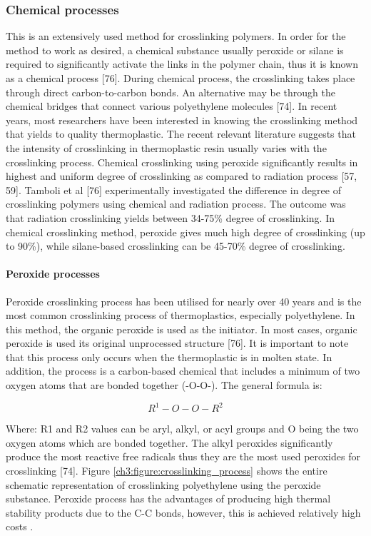 \documentclass[12pt]{report}
\begin{document}
\subsubsection{Chemical processes}
This is an extensively used method for crosslinking polymers. In order for the method to work as desired, a chemical substance usually peroxide or silane is required to significantly activate the links in the polymer chain, thus it is known as a chemical process [76]. During chemical process, the crosslinking takes place through direct carbon-to-carbon bonds. An alternative may be through the chemical bridges that connect various polyethylene molecules [74].  
In recent years, most researchers have been interested in knowing the crosslinking method that yields to quality thermoplastic. The recent relevant literature suggests that the intensity of crosslinking in thermoplastic resin usually varies with the crosslinking process. Chemical crosslinking using peroxide significantly results in highest and uniform degree of crosslinking as compared to radiation process [57, 59]. Tamboli et al [76] experimentally investigated the difference in degree of crosslinking polymers using chemical and radiation process. The outcome was that radiation crosslinking yields between 34-75\% degree of crosslinking. In chemical crosslinking method, peroxide gives much high degree of crosslinking (up to 90\%), while silane-based crosslinking can be 45-70\% degree of crosslinking.

\paragraph{Peroxide processes}
 Peroxide crosslinking process has been utilised for nearly over 40 years and is the most common crosslinking process of thermoplastics, especially polyethylene. In this method, the organic peroxide is used as the initiator. In most cases, organic peroxide is used its original unprocessed structure [76]. It is important to note that this process only occurs when the thermoplastic is in molten state. In addition, the process is a carbon-based chemical that includes a minimum of two oxygen atoms that are bonded together (-O-O-). The general formula is:  

 \begin{equation}
    R^1-O-O-R^2
 \end{equation}

Where: R1 and R2 values can be aryl, alkyl, or acyl groups and O being the two oxygen atoms which are bonded together. The alkyl peroxides significantly produce the most reactive free radicals thus they are the most used peroxides for crosslinking [74]. Figure \ref{ch3:figure:crosslinking_process} shows the entire schematic representation of crosslinking polyethylene using the peroxide substance. Peroxide process has the advantages of producing high thermal stability products due to the C-C bonds, however, this is achieved relatively high costs \cite{patterson2022cross}.
\end{document}
